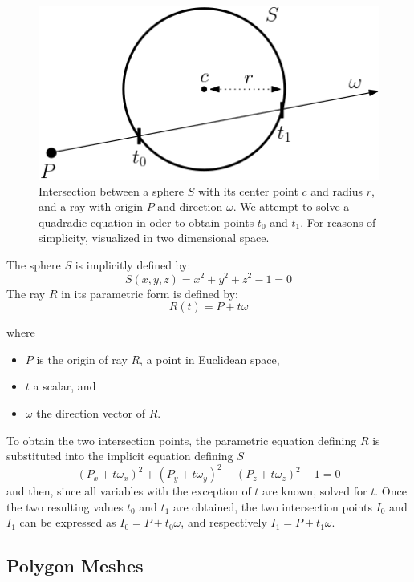 \begin{figure}[h]
	\centering
	\includegraphics[width=.5\linewidth]{img/1 fundamentals/sphere_isect.png}
	\caption{Intersection between a sphere $S$ with its center point $c$ and radius $r$, and a ray with origin $P$ and direction $\omega$. We attempt to solve a quadradic equation in oder to obtain points $t_{0}$ and $t_{1}$. For reasons of simplicity, visualized in two dimensional space.} 
	\label{fig:sphere_isect}
\end{figure}

The sphere $S$ is implicitly defined by: 
\begin{equation} \label{eq:sphere}
S(x,y,z) = x^{2}+y^{2}+z^{2}-1 = 0
\end{equation}
The ray $R$ in its parametric form is defined by:
\begin{equation}\label{eq:ray}
R(t) = P + t\omega
\end{equation}

\noindent where
\begin{itemize}
	\setlength\itemsep{0.05em}
	\item  $P$ is the origin of ray $R$, a point in Euclidean space,
	\item  $t$ a scalar, and
	\item  $\omega$ the direction vector of $R$.
\end{itemize}

To obtain the two intersection points, the parametric equation defining $R$ is substituted into the implicit equation defining $S$
\begin{equation}\label{eq:substitution}
(P_{x}+t\omega_{x})^{2}+(P_{y}+t\omega_{y})^{2}+(P_{z}+t\omega_{z})^{2}-1 = 0
\end{equation}
and then, since all variables with the exception of $t$ are known, solved for $t$.
Once the two resulting values $t_{0}$ and $t_{1}$ are obtained, the two intersection points $I_{0}$ and $I_{1}$ can be expressed as $I_{0} = P + t_{0}\omega$, and respectively $I_{1} = P + t_{1}\omega$.

\subsection{Polygon Meshes}

